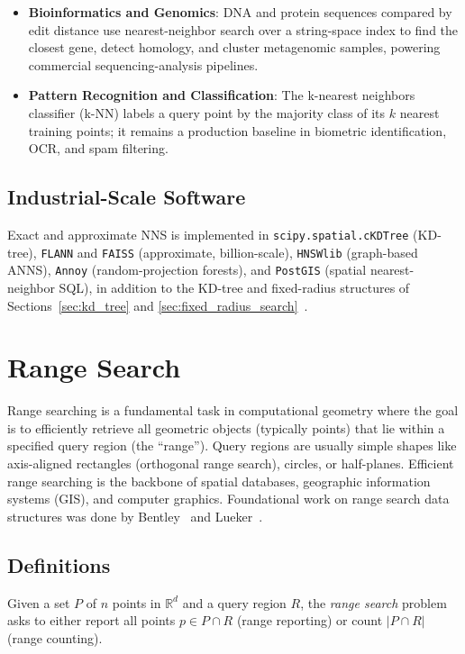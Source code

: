 \begin{itemize}
\item \textbf{Bioinformatics and Genomics}: DNA and protein sequences
  compared by edit distance use nearest-neighbor search over a string-space
  index to find the closest gene, detect homology, and cluster metagenomic
  samples, powering commercial sequencing-analysis pipelines.

\item \textbf{Pattern Recognition and Classification}: The k-nearest
  neighbors classifier (k-NN) labels a query point by the majority class of
  its $k$ nearest training points; it remains a production baseline in
  biometric identification, OCR, and spam filtering.
\end{itemize}

\subsection{Industrial-Scale Software}
Exact and approximate NNS is implemented in \texttt{scipy.spatial.cKDTree}
(KD-tree), \texttt{FLANN} and \texttt{FAISS} (approximate, billion-scale),
\texttt{HNSWlib} (graph-based ANNS), \texttt{Annoy} (random-projection
forests), and \texttt{PostGIS} (spatial nearest-neighbor SQL), in addition to
the KD-tree and fixed-radius structures of
Sections~\ref{sec:kd_tree} and \ref{sec:fixed_radius_search}~\cite{malkov2018}.


\section{Range Search}
\label{sec:range_search}

Range searching is a fundamental task in computational geometry where the goal is to efficiently retrieve all geometric objects (typically points) that lie within a specified query region (the ``range''). Query regions are usually simple shapes like axis-aligned rectangles (orthogonal range search), circles, or half-planes. Efficient range searching is the backbone of spatial databases, geographic information systems (GIS), and computer graphics. Foundational work on range search data structures was done by Bentley~\cite{bentley1975} and Lueker~\cite{lueker1978}.

\subsection{Definitions}

\begin{definition}\label{def:range_search}
Given a set $P$ of $n$ points in $\mathbb{R}^d$ and a query region $R$, the \emph{range search} problem asks to either report all points $p \in P \cap R$ (range reporting) or count $|P \cap R|$ (range counting).
\end{definition}

